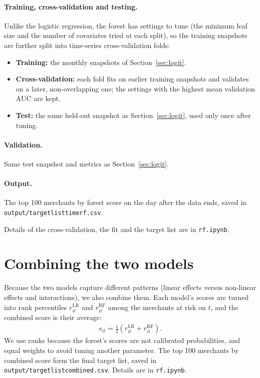 \documentclass[11pt]{article}
\newcommand{\code}[1]{\begingroup\renewcommand{\_}{\textunderscore\allowbreak}\texttt{#1}\endgroup}  %
\begin{document}
\paragraph{Training, cross-validation and testing.} Unlike the logistic regression, the forest has settings to tune (the minimum leaf size and the number of covariates tried at each split), so the training snapshots are further split into time-series cross-validation folds:
\begin{itemize}
  \item \textbf{Training:} the monthly snapshots of Section~\ref{sec:logit}.
  \item \textbf{Cross-validation:} each fold fits on earlier training snapshots and validates on a later, non-overlapping one; the settings with the highest mean validation AUC are kept.
  \item \textbf{Test:} the same held-out snapshot as Section~\ref{sec:logit}, used only once after tuning.
\end{itemize}

\paragraph{Validation.} Same test snapshot and metrics as Section~\ref{sec:logit}.

\paragraph{Output.} The top 100 merchants by forest score on the day after the data ends, saved in \code{output/target\_list\_time\_rf.csv}.

Details of the cross-validation, the fit and the target list are in \code{rf.ipynb}.

\section{Combining the two models}\label{sec:combine}

Because the two models capture different patterns (linear effects versus non-linear effects and interactions), we also combine them. Each model's scores are turned into rank percentiles $r^{\text{LR}}_{it}$ and $r^{\text{RF}}_{it}$ among the merchants at risk on $t$, and the combined score is their average:
\begin{align*}
s_{it} = \tfrac{1}{2} \left( r^{\text{LR}}_{it} + r^{\text{RF}}_{it} \right).
\end{align*}
We use ranks because the forest's scores are not calibrated probabilities, and equal weights to avoid tuning another parameter. The top 100 merchants by combined score form the final target list, saved in \code{output/target\_list\_combined.csv}. Details are in \code{rf.ipynb}.
\end{document}
